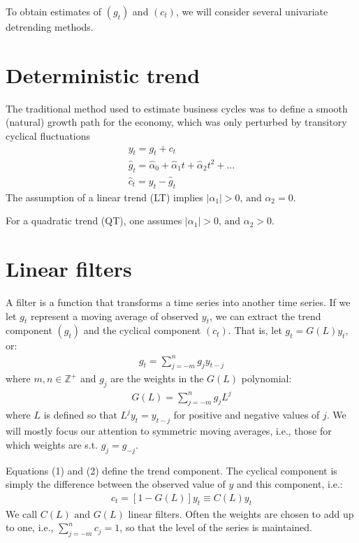 \documentclass[10pt]{article}
\begin{document}
To obtain estimates of $(g_t) $ and $(c_t) $, we will consider several univariate detrending methods. 
\section{Deterministic trend}
The traditional method used to estimate business cycles was to define a smooth (natural) growth path for the economy, which was only perturbed by transitory cyclical fluctuations
\begin{gather*}
    y_t = g_t + c_t \\
    \hat{g}_t = \hat{\alpha}_0 + \hat{\alpha}_1t + \hat{\alpha}_2t^2 + \dots\\
    \hat{c}_t = y_t - \hat{g}_t
\end{gather*}
The assumption of a linear trend (LT) implies $|\alpha_1| > 0 \text{, and }\alpha_2 = 0 $.

For a quadratic trend (QT), one assumes $|\alpha_1| > 0 \text{, and }\alpha_2 > 0 $.
\newpage 
\section{Linear filters}
A filter is a function that transforms a time series into another time series. If we let $g_t $ represent a moving average of observed $y_t $, we can extract the trend component $(g_t) $ and the cyclical component $(c_t) $. That is, let $g_t = G(L)y_t $, or: 
\begin{gather}
    g_t = \sum_{j = -m}^{n}g_jy_{t - j}
\end{gather}
where $m, n \in \mathbb{Z}^+$ and $g_j $ are the weights in the $G(L) $ polynomial: 
\begin{gather}
    G(L) = \sum_{j = -m}^{n} g_jL^j
\end{gather}
where $L $ is defined so that $L^jy_t = y_{t - j} $ for positive and negative values of $j $. We will mostly focus our attention to symmetric moving averages, i.e., those for which weights are s.t. $g_j = g_{-j} $.

Equations (1) and (2) define the trend component. The cyclical component is simply the difference between the observed value of $y $ and this component, i.e.:
\begin{gather*}
    c_t = [1 - G(L)]y_t\equiv C(L)y_t 
\end{gather*}
We call $C(L) \text{ and } G(L) $ linear filters. Often the weights are chosen to add up to one, i.e., $\sum_{j = -m}^{n}c_j = 1 $, so that the level of the series is maintained. 
\end{document}
